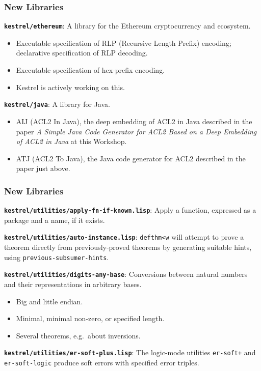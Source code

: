 \documentclass{beamer}
\newcommand{\code}[1]{\texttt{#1}}
\newcommand{\bookpath}[1]{\textbf{\code{#1}}}
\newcommand{\newlibtitle}{\frametitle{New Libraries}}
\newcommand{\separation}{\vspace*{1ex}}
\begin{document}
\begin{frame}

\newlibtitle

\bookpath{kestrel/ethereum}:
A library for the Ethereum
cryptocurrency and ecosystem.
\begin{itemize}
\item
Executable specification of RLP (Recursive Length Prefix) encoding;
declarative specification of RLP decoding.
\item
Executable specification of hex-prefix encoding.
\item
Kestrel is actively working on this.
\end{itemize}

\separation

\bookpath{kestrel/java}:
A library for Java.
\begin{itemize}
\item
AIJ (ACL2 In Java), the deep embedding of ACL2 in Java
described in the paper
\textit{A Simple Java Code Generator for ACL2
Based on a Deep Embedding of ACL2 in Java}
at this Workshop.
\item
ATJ (ACL2 To Java), the Java code generator for ACL2
described in the paper just above.
\end{itemize}

\end{frame}


\begin{frame}

\newlibtitle

\bookpath{kestrel/utilities/apply-fn-if-known.lisp}:
Apply a function, expressed as a package and a name, if it exists.

\separation

\bookpath{kestrel/utilities/auto-instance.lisp}:
\code{defthm<w} will attempt to prove a theorem directly
from previously-proved theorems by generating
suitable hints, using \code{previous-subsumer-hints}.

\separation

\bookpath{kestrel/utilities/digits-any-base}:
Conversions between natural numbers
and their representations in arbitrary bases.
\begin{itemize}
\item
Big and little endian.
\item
Minimal, minimal non-zero, or specified length.
\item
Several theorems, e.g.\ about inversions.
\end{itemize}

\separation

\bookpath{kestrel/utilities/er-soft-plus.lisp}:
The logic-mode utilities \code{er-soft+} and \code{er-soft-logic} produce
soft errors with specified error triples.

\end{frame}
\end{document}
